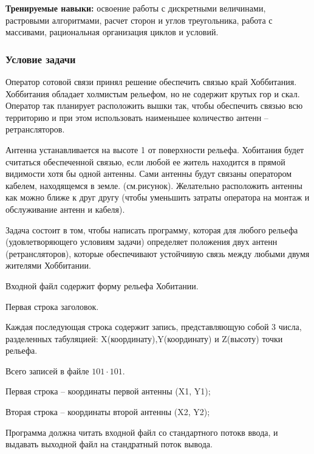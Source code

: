 
\textbf{Тренируемые навыки: }освоение работы с дискретными величинами, растровыми алгоритмами, расчет сторон и углов треугольника, работа с массивами, рациональная организация циклов и условий.

\subsubsection*{Условие задачи}

Оператор сотовой связи принял решение обеспечить связью край Хоббитания. Хоббитания обладает холмистым рельефом, но не содержит крутых гор и скал. Оператор так планирует расположить вышки так, чтобы обеспечить связью всю территорию и при этом использовать наименьшее количество антенн – ретрансляторов. 

Антенна устанавливается на высоте 1 от поверхности рельефа. Хобитания будет считаться обеспеченной связью, если любой ее житель находится в прямой видимости хотя бы одной антенны. Сами антенны будут связаны оператором кабелем, находящемся в земле. (см.рисунок). Желательно расположить антенны как можно ближе к друг другу (чтобы уменьшить затраты оператора на монтаж и обслуживание антенн и кабеля).


Задача состоит в том, чтобы написать программу, которая для любого рельефа (удовлетворяющего условиям задачи) определяет положения двух антенн (ретрансляторов), которые обеспечивают устойчивую связь между любыми двумя жителями Хоббитании.


Входной файл содержит форму рельефа Хобитании.

Первая строка заголовок.

Каждая последующая строка содержит запись, представляющую собой 3 числа, разделенных табуляцией:
X(координату),Y(координату) и Z(высоту) точки рельефа.

Всего записей в файле $101 \cdot 101$.

\outputfmtSection

Первая строка – координаты первой антенны (X1, Y1);

Вторая строка – координаты второй антенны (X2, Y2);

Программа должна читать входной файл со стандартного потокв ввода, и выдавать выходной файл на стандратный поток вывода.

\markSection

